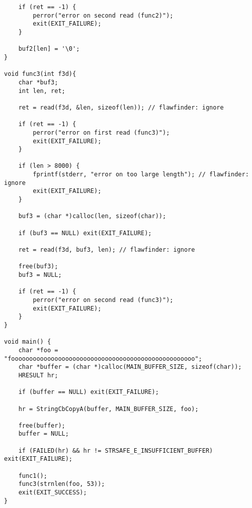 \begin{lstlisting}
    if (ret == -1) {
    	perror("error on second read (func2)");
		exit(EXIT_FAILURE);
	}
	
    buf2[len] = '\0';
}

void func3(int f3d){
    char *buf3;
    int len, ret;
        
    ret = read(f3d, &len, sizeof(len)); // flawfinder: ignore
    
    if (ret == -1) {
    	perror("error on first read (func3)");
		exit(EXIT_FAILURE);
	}

    if (len > 8000) {
        fprintf(stderr, "error on too large length"); // flawfinder: ignore
        exit(EXIT_FAILURE);
    }

    buf3 = (char *)calloc(len, sizeof(char));
    
    if (buf3 == NULL) exit(EXIT_FAILURE);
    
    ret = read(f3d, buf3, len); // flawfinder: ignore
    
    free(buf3);
    buf3 = NULL;
    
    if (ret == -1) {
    	perror("error on second read (func3)");
		exit(EXIT_FAILURE);
	}
}

void main() {
    char *foo = "fooooooooooooooooooooooooooooooooooooooooooooooooooo";
    char *buffer = (char *)calloc(MAIN_BUFFER_SIZE, sizeof(char));
    HRESULT hr;
    
    if (buffer == NULL) exit(EXIT_FAILURE);
		
    hr = StringCbCopyA(buffer, MAIN_BUFFER_SIZE, foo);
	
    free(buffer);
    buffer = NULL;

    if (FAILED(hr) && hr != STRSAFE_E_INSUFFICIENT_BUFFER) exit(EXIT_FAILURE);
    
    func1();
    func3(strnlen(foo, 53));
    exit(EXIT_SUCCESS);
}
\end{lstlisting}
